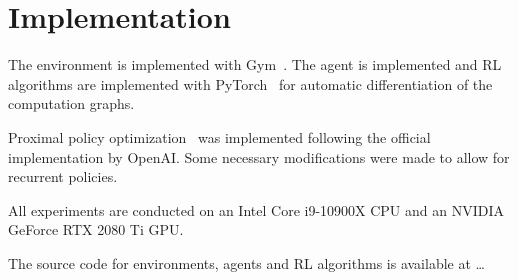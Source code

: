 
\section{Implementation}

The environment is implemented with Gym~\cite{brockman_gym_2016}. The agent is implemented and RL algorithms are implemented with PyTorch~\cite{paszke_pytorch_nodate} for automatic differentiation of the computation graphs.

Proximal policy optimization~\cite{schulman_ppo_2017} was implemented following the official implementation by OpenAI.
Some necessary modifications were made to allow for recurrent policies.

All experiments are conducted on an Intel Core i9-10900X CPU and an NVIDIA GeForce RTX 2080 Ti GPU.

The source code for environments, agents and RL algorithms is available at \dots
{}








